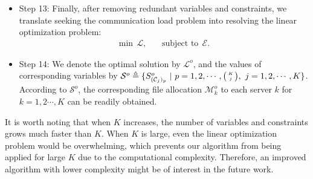 \documentclass[conference]{IEEEtran}
\begin{document}
\begin{itemize}
\item{Step 13:} Finally, after removing redundant variables and constraints, we translate seeking the communication load problem into resolving the linear optimization problem:
\begin{eqnarray*}
\textrm{min} ~~ \mathcal{L},~~~~~~~~\textrm{subject to} ~~ \mathcal{E}.
\end{eqnarray*}

\item{Step 14:} We denote the optimal solution by $\mathcal{L}^o$, and the values of corresponding variables by $\mathcal{S}^o\triangleq \{S^o_{(\mathcal{C}_j)_p}~|~p=1,2,\cdots,\big(\!\!\begin{tiny}\begin{array}{c}K\\j\end{array}\end{tiny}\!\!\big),~j=1,2,\cdots,K\}$. According to $\mathcal{S}^o$, the corresponding file allocation $\mathcal{M}_k^o$ to each server $k$ for $k=1,2\cdots,K$ can be readily obtained.

\end{itemize}



\begin{remark}
It is worth noting that when $K$ increases, the number of variables and constraints grows much faster than $K$. When $K$ is large, even the linear optimization problem would be overwhelming, which prevents our algorithm from being applied for large $K$ due to the computational complexity. Therefore, an improved algorithm with lower complexity might be of interest in the future work.
\end{remark}
\end{document}
